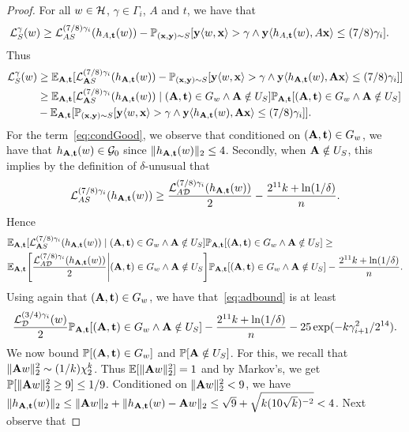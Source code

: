 \begin{proof}
For all $w \in \mathcal{H}$, $\gamma \in \Gamma_i$, $A$ and $t$, we have that
\begin{align*}
    \mathcal{L}_{S}^\gamma(w) &\geq \mathcal{L}^{(7/8)\gamma_i}_{A S}(h_{A,\mathbf{t}}(w)) - \mathbb{P}_{(\mathbf{x},\mathbf{y})\sim S}[\mathbf{y} \langle w, \mathbf{x} \rangle > \gamma \wedge \mathbf{y} \langle h_{A,\mathbf{t}}(w), A \mathbf{x} \rangle \leq (7/8)\gamma_i].
\end{align*}
Thus
\begin{align}
    \mathcal{L}_{S}^\gamma(w) &\geq \mathbb{E}_{\mathbf{A},\mathbf{t}}[\mathcal{L}^{(7/8)\gamma_i}_{\mathbf{A} S}(h_{\mathbf{A},\mathbf{t}}(w)) - \mathbb{P}_{(\mathbf{x},\mathbf{y})\sim S}[\mathbf{y} \langle w, \mathbf{x} \rangle > \gamma \wedge \mathbf{y} \langle h_{\mathbf{A},\mathbf{t}}(w), \mathbf{A} \mathbf{x} \rangle \leq (7/8)\gamma_i]] \nonumber\\
    &\geq \mathbb{E}_{\mathbf{A},\mathbf{t}}[\mathcal{L}^{(7/8)\gamma_i}_{\mathbf{A} S}(h_{\mathbf{A},\mathbf{t}}(w)) \mid (\mathbf{A},\mathbf{t}) \in G_w \wedge \mathbf{A} \notin U_S] \mathbb{P}_{\mathbf{A},\mathbf{t}}[(\mathbf{A},\mathbf{t}) \in G_w \wedge \mathbf{A} \notin U_S] \label{eq:condGood}\\
    &-\mathbb{E}_{\mathbf{A},\mathbf{t}}[\mathbb{P}_{(\mathbf{x},\mathbf{y})\sim S}[\mathbf{y} \langle w, \mathbf{x} \rangle > \gamma \wedge \mathbf{y} \langle h_{\mathbf{A},\mathbf{t}}(w), \mathbf{A} \mathbf{x} \rangle \leq (7/8)\gamma_i]]\label{eq:randroundoff}.
\end{align}
For the term~\eqref{eq:condGood}, we observe that conditioned on $(\mathbf{A},\mathbf{t}) \in G_w$, we have that $h_{\mathbf{A},\mathbf{t}}(w) \in \mathcal{G}_0$ since $\|h_{\mathbf{A},\mathbf{t}}(w)\|_2 \leq 4$. Secondly, when $\mathbf{A} \notin U_S$, this implies by the definition of $\delta$-unusual that
\[
\mathcal{L}_{A S}^{(7/8)\gamma_i}(h_{\mathbf{A},\mathbf{t}}(w)) \geq \frac{\mathcal{L}_{A \mathcal{D}}^{(7/8)\gamma_i}(h_{\mathbf{A},\mathbf{t}}(w))}{2} - \frac{2^{11} k + \ln(1/\delta)}{n}.
\]
Hence
\begin{align}
    &\mathbb{E}_{\mathbf{A},\mathbf{t}}[\mathcal{L}^{(7/8)\gamma_i}_{\mathbf{A} S}(h_{\mathbf{A},\mathbf{t}}(w)) \mid (\mathbf{A},\mathbf{t}) \in G_w \wedge \mathbf{A} \notin U_S] \mathbb{P}_{\mathbf{A},\mathbf{t}}[(\mathbf{A},\mathbf{t}) \in G_w \wedge \mathbf{A} \notin U_S] \geq \nonumber\\
    &\mathbb{E}_{\mathbf{A},\mathbf{t}}\Bigg[\frac{\mathcal{L}_{A \mathcal{D}}^{(7/8)\gamma_i}(h_{\mathbf{A},\mathbf{t}}(w))}{2} \Bigg|(\mathbf{A},\mathbf{t}) \in G_w \wedge \mathbf{A} \notin U_S\Bigg]\mathbb{P}_{\mathbf{A},\mathbf{t}}[(\mathbf{A},\mathbf{t})\in G_w \wedge \mathbf{A} \notin U_S] - \frac{2^{11} k + \ln(1/\delta)}{n}.\label{eq:adbound}
\end{align}
Using again that $(\mathbf{A}, \mathbf{t}) \in G_w$, we have that~\eqref{eq:adbound} is at least
\begin{align}
    \frac{\mathcal{L}_{ \mathcal{D}}^{(3/4)\gamma_i}(w)}{2} \mathbb{P}_{\mathbf{A},\mathbf{t}}[(\mathbf{A},\mathbf{t})\in G_w \wedge \mathbf{A} \notin U_S] - \frac{2^{11} k + \ln(1/\delta)}{n} -25 \exp(-k \gamma_{i+1}^2/2^{14}). \label{eq:lastprop}
\end{align}
We now bound $\mathbb{P}[(\mathbf{A},\mathbf{t}) \in G_w]$  and $\mathbb{P}[\mathbf{A} \notin U_S]$. For this, we recall that $\|\mathbf{A} w\|_2^2 \sim (1/k)\chi_2^k$. Thus $\mathbb{E}[\|\mathbf{A} w\|_2^2] =1$ and by Markov's, we get $\mathbb{P}[\|\mathbf{A} w\|_2^2 \geq 9] \leq 1/9$. Conditioned on $\|\mathbf{A} w\|_2^2 < 9$, we have $\|h_{\mathbf{A},\mathbf{t}}(w)\|_2 \leq \|\mathbf{A} w\|_2 + \|h_{\mathbf{A},\mathbf{t}}(w)-\mathbf{A} w\|_2 \leq \sqrt{9} + \sqrt{k (10 \sqrt{k})^{-2}} < 4$. Next observe that

\end{proof}
